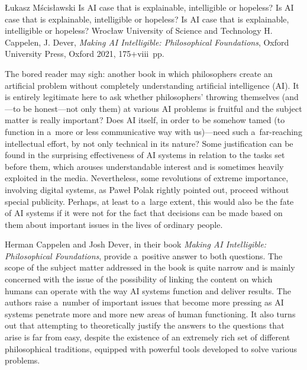 \begin{newrevengenv}{Łukasz Mścisławski}
	{Is AI case that is explainable, intelligible or hopeless?}
	{Is AI case that is explainable, intelligible or hopeless?}
	{Is AI case that is explainable, intelligible or hopeless?}
	{Wrocław University of Science and Technology}
	{H. Cappelen, J. Dever, \textit{Making AI Intelligible: Philosophical Foundations}, Oxford University Press, Oxford 2021, 175+viii~pp.}


\lettrine[loversize=0.13,lines=2,lraise=-0.03,nindent=0em,findent=0.2pt]%
{T}{}he bored reader may sigh: another book in which philosophers create an artificial problem without completely understanding artificial intelligence (AI). It is entirely legitimate here to ask whether philosophers' throwing themselves (and---to be honest---not only them) at various AI problems is fruitful and the subject matter is really important? Does AI itself, in order to be somehow tamed (to function in a~more or less communicative way with us)---need such a~far-reaching intellectual effort, by not only technical in its nature? Some justification can be found in the surprising effectiveness of AI systems in relation to the tasks set before them, which arouses understandable interest and is sometimes heavily exploited in the media. Nevertheless, some revolutions of extreme importance, involving digital systems, as Paweł Polak
\parencite*[][p.151]{polak_bezglosna_2015} %
 rightly pointed out, proceed without special publicity. Perhaps, at least to a~large extent, this would also be the fate of AI systems if it were not for the fact that decisions can be made based on them about important issues in the lives of ordinary people.

Herman Cappelen and Josh Dever, in their book \textit{Making AI Intelligible: Philosophical Foundations}, provide a~positive answer to both questions. The scope of the subject matter addressed in the book is quite narrow and is mainly concerned with the issue of the possibility of linking the content on which humans can operate with the way AI systems function and deliver results. The authors raise a~number of important issues that become more pressing as AI systems penetrate more and more new areas of human functioning. It also turns out that attempting to theoretically justify the answers to the questions that arise is far from easy, despite the existence of an extremely rich set of different philosophical traditions, equipped with powerful tools developed to solve various problems.


\end{newrevengenv}
